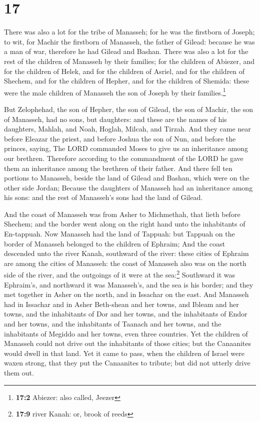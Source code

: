 \hypertarget{section-16}{%
\section{17}\label{section-16}}

 There was also a lot for the tribe of Manasseh; for he
was the firstborn of Joseph; to wit, for Machir the firstborn of
Manasseh, the father of Gilead: because he was a man of war, therefore
he had Gilead and Bashan.  There was also a lot for the
rest of the children of Manasseh by their families; for the children of
Abiezer, and for the children of Helek, and for the children of Asriel,
and for the children of Shechem, and for the children of Hepher, and for
the children of Shemida: these were the male children of Manasseh the
son of Joseph by their families.\footnote{\textbf{17:2} Abiezer: also
  called, Jeezer}

 But Zelophehad, the son of Hepher, the son of Gilead, the
son of Machir, the son of Manasseh, had no sons, but daughters: and
these are the names of his daughters, Mahlah, and Noah, Hoglah, Milcah,
and Tirzah.  And they came near before Eleazar the priest,
and before Joshua the son of Nun, and before the princes, saying, The
LORD commanded Moses to give us an inheritance among our brethren.
Therefore according to the commandment of the LORD he gave them an
inheritance among the brethren of their father.  And there
fell ten portions to Manasseh, beside the land of Gilead and Bashan,
which were on the other side Jordan;  Because the
daughters of Manasseh had an inheritance among his sons: and the rest of
Manasseh's sons had the land of Gilead.

 And the coast of Manasseh was from Asher to Michmethah,
that lieth before Shechem; and the border went along on the right hand
unto the inhabitants of En-tappuah.  Now Manasseh had the
land of Tappuah: but Tappuah on the border of Manasseh belonged to the
children of Ephraim;  And the coast descended unto the
river Kanah, southward of the river: these cities of Ephraim are among
the cities of Manasseh: the coast of Manasseh also was on the north side
of the river, and the outgoings of it were at the sea:\footnote{\textbf{17:9}
  river Kanah: or, brook of reeds}  Southward it was
Ephraim's, and northward it was Manasseh's, and the sea is his border;
and they met together in Asher on the north, and in Issachar on the
east.  And Manasseh had in Issachar and in Asher
Beth-shean and her towns, and Ibleam and her towns, and the inhabitants
of Dor and her towns, and the inhabitants of Endor and her towns, and
the inhabitants of Taanach and her towns, and the inhabitants of Megiddo
and her towns, even three countries.  Yet the children of
Manasseh could not drive out the inhabitants of those cities; but the
Canaanites would dwell in that land.  Yet it came to
pass, when the children of Israel were waxen strong, that they put the
Canaanites to tribute; but did not utterly drive them out.

